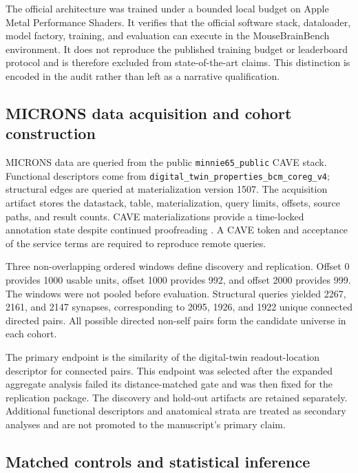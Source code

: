 The official architecture was trained under a bounded local budget on Apple
Metal Performance Shaders. It verifies that the official software stack,
dataloader, model factory, training, and evaluation can execute in the
MouseBrainBench environment. It does not reproduce the published training
budget or leaderboard protocol and is therefore excluded from state-of-the-art
claims. This distinction is encoded in the audit rather than left as a narrative
qualification.

\subsection{MICRONS data acquisition and cohort construction}

MICRONS data are queried from the public \texttt{minnie65\_public} CAVE stack.
Functional descriptors come from
\texttt{digital\_twin\_properties\_bcm\_coreg\_v4}; structural edges are
queried at materialization version 1507. The acquisition artifact stores the
datastack, table, materialization, query limits, offsets, source paths, and
result counts. CAVE materializations provide a time-locked annotation state
despite continued proofreading \citep{dorkenwald2025cave}. A CAVE token and
acceptance of the service terms are required to reproduce remote queries.

Three non-overlapping ordered windows define discovery and replication. Offset
0 provides 1000 usable units, offset 1000 provides 992, and offset 2000 provides
999. The windows were not pooled before evaluation. Structural queries yielded
2267, 2161, and 2147 synapses, corresponding to 2095, 1926, and 1922 unique
connected directed pairs. All possible directed non-self pairs form the
candidate universe in each cohort.

The primary endpoint is the similarity of the digital-twin readout-location
descriptor for connected pairs. This endpoint was selected after the expanded
aggregate analysis failed its distance-matched gate and was then fixed for the
replication package. The discovery and hold-out artifacts are retained
separately. Additional functional descriptors and anatomical strata are treated
as secondary analyses and are not promoted to the manuscript's primary claim.

\subsection{Matched controls and statistical inference}

